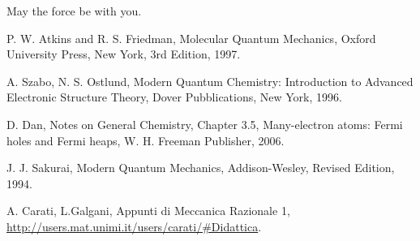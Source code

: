 \documentclass[a4paper,12pt]{article}
\begin{document}
May the force be with you.



\clearpage
{}
\begin{thebibliography}{9}


%
%

P. W. Atkins and R. S. Friedman,
Molecular Quantum Mechanics,
Oxford University Press, New York,
3rd Edition,
1997.

A. Szabo, N. S. Ostlund,
Modern Quantum Chemistry: Introduction to Advanced Electronic Structure Theory,
Dover Pubblications, New York,
1996.

D. Dan, Notes on General Chemistry,
Chapter 3.5, Many-electron atoms: Fermi holes and Fermi heaps,
W. H. Freeman Publisher,
2006.

J. J. Sakurai,
Modern Quantum Mechanics,
Addison-Wesley,
Revised Edition,
1994.

A. Carati, L.Galgani,
Appunti di Meccanica Razionale 1,
\url{http://users.mat.unimi.it/users/carati/#Didattica}.

\end{thebibliography}
\end{document}
